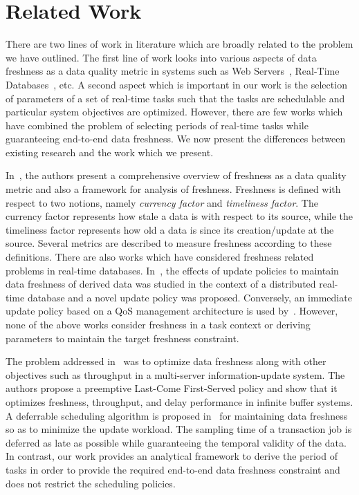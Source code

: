 \section{Related Work}
There are two lines of work in literature which are broadly related to the problem we have outlined. The first line of work looks into various aspects of data freshness as a data quality metric in systems such as Web Servers~\cite{labrinidis2004exploring}, Real-Time Databases~\cite{wei2004maintaining,kang2004managing}, etc. A second aspect which is important in our work is the selection of parameters of a set of real-time tasks such that the tasks are schedulable and particular system objectives are optimized. However, there are few works which have combined the problem of selecting periods of real-time tasks while guaranteeing end-to-end data freshness. We now present the differences between existing research and the work which we present.

In~\cite{bouzeghoub2004framework,peralta2006data}, the authors present a comprehensive overview of freshness as a data quality metric and also a framework for analysis of freshness. Freshness is defined with respect to two notions, namely \emph{currency factor} and \emph{timeliness factor}. The currency factor represents how stale a data is with respect to its source, while the timeliness factor represents how old a data is since its creation/update at the source. Several metrics are described to measure freshness according to these definitions. There are also works which have considered freshness related problems in real-time databases. In~\cite{wei2004maintaining}, the effects of update policies to maintain data freshness of derived data was studied in the context of a distributed real-time database and a novel update policy was proposed. Conversely, an immediate update policy based on a QoS management architecture is used by~\cite{kang2004managing}. However, none of the above works consider freshness in a task context or deriving parameters to maintain the target freshness constraint.

The problem addressed in~\cite{bedewy2016optimizing} was to optimize data freshness along with other objectives such as throughput in a multi-server information-update system. The authors propose a preemptive Last-Come First-Served policy and show that it optimizes freshness, throughput, and delay performance in infinite buffer systems. A deferrable scheduling algorithm is proposed in~\cite{xiong2005deferrable} for maintaining data freshness so as to minimize the update workload. The sampling time of a transaction job is deferred as late as possible while guaranteeing the temporal validity of the data. In contrast, our work provides an analytical framework to derive the period of tasks in order to provide the required end-to-end data freshness constraint and does not restrict the scheduling policies.

